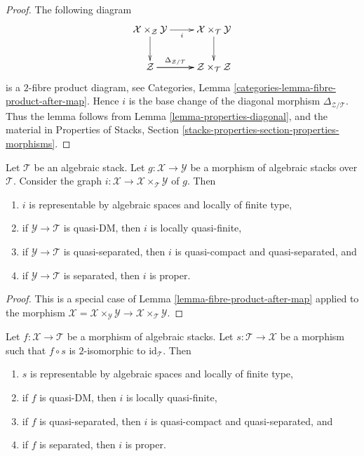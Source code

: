 \begin{proof}
The following diagram
$$
\xymatrix{
\mathcal{X} \times_\mathcal{Z} \mathcal{Y} \ar[r]_i \ar[d] &
\mathcal{X} \times_\mathcal{T} \mathcal{Y} \ar[d] \\
\mathcal{Z} \ar[r]^-{\Delta_{\mathcal{Z}/\mathcal{T}}} \ar[r] &
\mathcal{Z} \times_\mathcal{T} \mathcal{Z}
}
$$
is a $2$-fibre product diagram, see
Categories, Lemma \ref{categories-lemma-fibre-product-after-map}.
Hence $i$ is the base change of the
diagonal morphism $\Delta_{\mathcal{Z}/\mathcal{T}}$. Thus the lemma follows
from
Lemma \ref{lemma-properties-diagonal},
and the material in
Properties of Stacks,
Section \ref{stacks-properties-section-properties-morphisms}.
\end{proof}

\begin{lemma}
\label{lemma-semi-diagonal}
Let $\mathcal{T}$ be an algebraic stack. Let $g : \mathcal{X} \to \mathcal{Y}$
be a morphism of algebraic stacks over $\mathcal{T}$. Consider the graph
$i : \mathcal{X} \to \mathcal{X} \times_\mathcal{T} \mathcal{Y}$ of $g$. Then
\begin{enumerate}
\item $i$ is representable by algebraic spaces and locally of finite type,
\item if $\mathcal{Y} \to \mathcal{T}$ is quasi-DM, then $i$ is locally
quasi-finite,
\item if $\mathcal{Y} \to \mathcal{T}$ is quasi-separated, then $i$ is
quasi-compact and quasi-separated, and
\item if $\mathcal{Y} \to \mathcal{T}$ is separated, then $i$ is proper.
\end{enumerate}
\end{lemma}

\begin{proof}
This is a special case of Lemma \ref{lemma-fibre-product-after-map}
applied to the morphism
$\mathcal{X} = \mathcal{X} \times_\mathcal{Y} \mathcal{Y} \to
\mathcal{X}\times_\mathcal{T} \mathcal{Y}$.
\end{proof}

\begin{lemma}
\label{lemma-section-immersion}
Let $f : \mathcal{X} \to \mathcal{T}$ be a morphism of algebraic stacks.
Let $s : \mathcal{T} \to \mathcal{X}$ be a morphism such that
$f \circ s$ is $2$-isomorphic to $\text{id}_\mathcal{T}$. Then
\begin{enumerate}
\item $s$ is representable by algebraic spaces and locally of finite type,
\item if $f$ is quasi-DM, then $i$ is locally quasi-finite,
\item if $f$ is quasi-separated, then
$i$ is quasi-compact and quasi-separated, and
\item if $f$ is separated, then $i$ is proper.
\end{enumerate}
\end{lemma}

